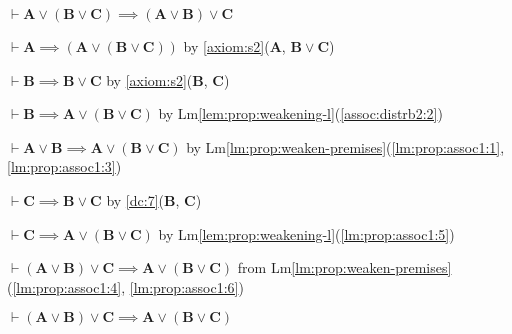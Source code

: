 \documentclass{amsart}%
\newcommand\metavariable[1]{\boldsymbol{#1}}
\begin{document}
\begin{lemma}\label{lm:prop:assoc1}
$\vdash\metavariable{A}\lor(\metavariable{B}\lor\metavariable{C})\implies(\metavariable{A}\lor\metavariable{B})\lor\metavariable{C}$
\end{lemma}

\begin{pf}
\item\label{lm:prop:assoc1:1} $\vdash\metavariable{A}\implies(\metavariable{A}\lor(\metavariable{B}\lor\metavariable{C}))$
  by \ref{axiom:s2}($\metavariable{A}$, $\metavariable{B}\lor\metavariable{C}$)
\item\label{assoc:distrb2:2} $\vdash\metavariable{B}\implies\metavariable{B}\lor\metavariable{C}$
  by \ref{axiom:s2}($\metavariable{B}$, $\metavariable{C}$)
\item\label{lm:prop:assoc1:3} $\vdash\metavariable{B}\implies\metavariable{A}\lor(\metavariable{B}\lor\metavariable{C})$
  by Lm\ref{lem:prop:weakening-l}(\ref{assoc:distrb2:2})
\item\label{lm:prop:assoc1:4} $\vdash\metavariable{A}\lor\metavariable{B}\implies\metavariable{A}\lor(\metavariable{B}\lor\metavariable{C})$
  by Lm\ref{lm:prop:weaken-premises}(\ref{lm:prop:assoc1:1}, \ref{lm:prop:assoc1:3})
\item\label{lm:prop:assoc1:5} $\vdash\metavariable{C}\implies\metavariable{B}\lor\metavariable{C}$
  by \ref{dc:7}($\metavariable{B}$, $\metavariable{C}$)
\item\label{lm:prop:assoc1:6} $\vdash\metavariable{C}\implies\metavariable{A}\lor(\metavariable{B}\lor\metavariable{C})$
  by Lm\ref{lem:prop:weakening-l}(\ref{lm:prop:assoc1:5})
\item $\vdash(\metavariable{A}\lor\metavariable{B})\lor\metavariable{C}\implies\metavariable{A}\lor(\metavariable{B}\lor\metavariable{C})$
  from Lm\ref{lm:prop:weaken-premises}(\ref{lm:prop:assoc1:4}, \ref{lm:prop:assoc1:6})
\end{pf}

\begin{lemma}\label{lemma:prop:disj-assoc2}
$\vdash(\metavariable{A}\lor\metavariable{B})\lor\metavariable{C}\implies\metavariable{A}\lor(\metavariable{B}\lor\metavariable{C})$
\end{lemma}
\end{document}

